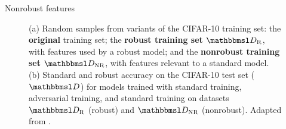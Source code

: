 \documentclass{beamer}
\newcommand{\citet}[1]{{\color{citecolor}\relscale{0.8}\textcite{#1}}}
\begin{document}
\begin{frame}[allowframebreaks=0.9]{Nonrobust features}
\begin{figure}
\begin{subfigure}[b]{0.49\textwidth}
			\caption{}
			\label{fig:robustify_cifar}
		\end{subfigure}
		\caption{
			(a) Random samples from variants of the
			CIFAR-10 training set:
			the \textbf{original} training set; 
			the \textbf{robust training set} $\set D_\text{R}$, with features used by a
			robust model; and
			the \textbf{nonrobust training set} $\set D_\text{NR}$, with
			features relevant to a standard model.
			(b) Standard and robust accuracy on the CIFAR-10
			test set ($\set D$) for models trained with standard training, adversarial training, and standard training on datasets $\set D_\text{R}$ (robust) and $\set D_\text{NR}$ (nonrobust). Adapted from \citet{Ilyas:2019:AENBTF}.}
		\label{fig:iliyas-experiment-results}
	\end{figure}
\end{frame}
\end{document}
